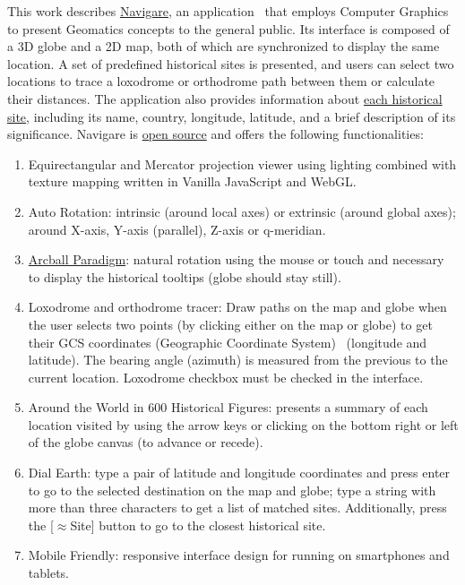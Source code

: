 \documentclass[onecolumn,3p]{elsarticle}
\begin{document}
This work describes \href{https://krotalias.github.io/cwdc/13-webgl/extras/LightingWithTextureV.html}{Navigare},
an application~\cite{Navigare2026} that employs Computer Graphics to present Geomatics concepts to the general public.
Its interface is composed of a 3D globe and a 2D map, both of which are synchronized
to display the same location. A set of predefined
historical sites is presented, and users can select two locations to trace a loxodrome or orthodrome
path between them or calculate their distances.
The application also provides information about
\href{https://krotalias.github.io/cwdc/13-webgl/extras/images/Bunny.mp4}{each historical site}, including its name, country, longitude, latitude,
and a brief description of its significance.
Navigare is \href{https://choosealicense.com/pt/licenses/lgpl-3.0/}{open source} and offers the following functionalities:

\begin{enumerate}
\item Equirectangular and Mercator projection viewer using lighting combined with
    texture mapping written in Vanilla JavaScript and WebGL.

\item Auto Rotation: intrinsic (around local axes) or extrinsic (around global axes); around X-axis, Y-axis (parallel), Z-axis or q-meridian.

\item \href{https://krotalias.github.io/cwdc/13-webgl/extras/doc/ArcBallPresentation.pdf}{Arcball Paradigm}:
natural rotation using the mouse or touch and necessary to display the historical tooltips (globe should stay still).

\item Loxodrome and orthodrome tracer: Draw paths on the map and globe when the user selects two points
    (by clicking either on the map or globe) to get their GCS coordinates (Geographic Coordinate System)~\cite{IBM2026}
    (longitude and latitude).
    The bearing angle (azimuth) is measured from the previous to the current location.
    Loxodrome checkbox must be checked in the interface.

\item Around the World in 600 Historical Figures: presents a summary of each location visited by using the arrow keys
    or clicking on the bottom right or left of the globe canvas (to advance or recede).

\item Dial Earth: type a pair of latitude and longitude coordinates and press enter to go to the
    selected destination on the map and globe; type a string with more than three characters to get a list of matched sites.
    Additionally, press the [$\approx$Site] button to go to the closest historical site.

\item Mobile Friendly: responsive interface design for running on smartphones and tablets.
\end{enumerate}
\end{document}
